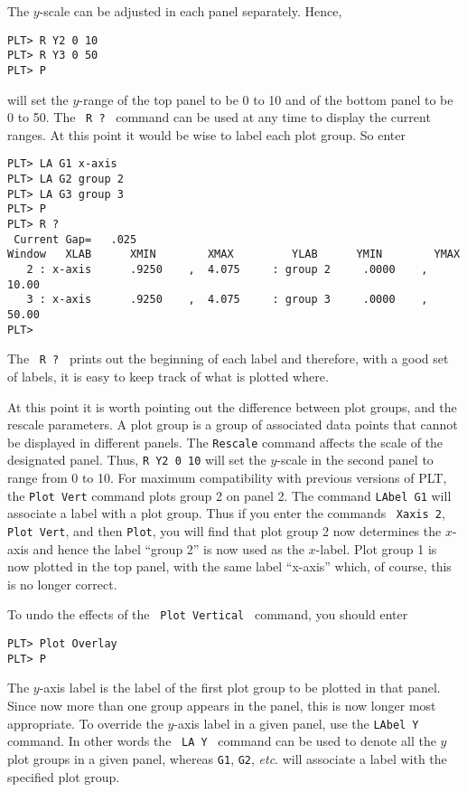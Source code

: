 The $y$-scale can be adjusted in each panel separately.
Hence,
\begin{verbatim}
PLT> R Y2 0 10
PLT> R Y3 0 50
PLT> P
\end{verbatim}
will set the $y$-range of the top panel to be 0 to 10
and of the bottom panel to be 0 to 50.
The \, {\tt R~?} \, command can be used at any time to display
the current ranges.
At this point it would be wise to label each plot group.
So enter
\begin{verbatim}
PLT> LA G1 x-axis
PLT> LA G2 group 2
PLT> LA G3 group 3
PLT> P
PLT> R ?
 Current Gap=   .025
Window   XLAB      XMIN        XMAX         YLAB      YMIN        YMAX
   2 : x-axis      .9250    ,  4.075     : group 2     .0000    ,  10.00    
   3 : x-axis      .9250    ,  4.075     : group 3     .0000    ,  50.00    
PLT>
\end{verbatim}
The \, {\tt R~?} \, prints out the beginning of each label
and therefore, with a good set of labels,
it is easy to keep track of what is plotted where.

At this point it is worth pointing out the difference between plot
groups, and the rescale parameters.
A plot group is a group of associated data points that cannot be
displayed in different panels.
The {\tt Rescale} command affects the scale of the designated panel.
Thus, {\tt R~Y2~0~10} will set the $y$-scale in the second panel
to range from 0 to 10.
For maximum compatibility with previous versions of PLT,
the {\tt Plot Vert} command plots group 2 on panel 2.
The command {\tt LAbel G1} will associate a label with a plot group.
Thus if you enter the commands \, {\tt Xaxis~2}, \,
{\tt Plot Vert}, and then {\tt Plot},
you will find that plot group 2 now determines the $x$-axis
and hence the label ``group 2'' is now used as the $x$-label.
Plot group 1 is now plotted in the top panel,
with the same label ``x-axis'' which,
of course, this is no longer correct.

To undo the effects of the \, {\tt Plot~Vertical} \, command,
you should enter
\begin{verbatim}
PLT> Plot Overlay
PLT> P
\end{verbatim}
The $y$-axis label is the label of the first plot group to be
plotted in that panel.
Since now more than one group appears in the panel,
this is now longer most appropriate.
To override the $y$-axis label in a given panel,
use the {\tt LAbel~Y} command.
In other words the \, {\tt LA~Y} \, command
can be used to denote all the $y$ plot groups in a given panel,
whereas {\tt G1}, {\tt G2}, {\it etc}. will associate
a label with the specified plot group.

